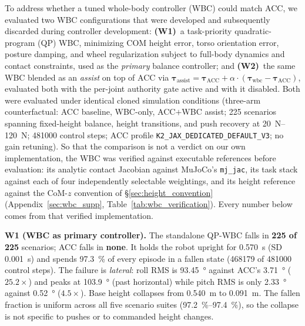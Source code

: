 \documentclass[conference]{IEEEtran}
\begin{document}
To address whether a tuned whole-body controller (WBC) could match ACC, we evaluated two WBC configurations that were developed and subsequently discarded during controller development:
\textbf{(W1)}~a task-priority quadratic-program (QP) WBC, minimizing COM height error, torso orientation error, posture damping, and wheel regularization subject to full-body dynamics and contact constraints, used as the \emph{primary} balance controller; and
\textbf{(W2)}~the same WBC blended as an \emph{assist} on top of ACC via $\boldsymbol{\tau}_{\text{assist}} = \boldsymbol{\tau}_{\text{ACC}} + \alpha\!\cdot\!(\boldsymbol{\tau}_{\text{wbc}} - \boldsymbol{\tau}_{\text{ACC}})$, evaluated both with the per-joint authority gate active and with it disabled.
Both were evaluated under identical cloned simulation conditions (three-arm counterfactual: ACC baseline, WBC-only, ACC$+$WBC assist; 225 scenarios spanning fixed-height balance, height transitions, and push recovery at \SIrange{20}{120}{N}; \num{481000} control steps; ACC profile \texttt{K2\_JAX\_DEDICATED\_DEFAULT\_V3}; no gain retuning).
So that the comparison is not a verdict on our own implementation, the WBC was verified against executable references before evaluation: its analytic contact Jacobian against MuJoCo's \texttt{mj\_jac}, its task stack against each of four independently selectable weightings, and its height reference against the CoM-$z$ convention of \S\ref{sec:height_convention} (Appendix~\ref{sec:wbc_supp}, Table~\ref{tab:wbc_verification}). Every number below comes from that verified implementation.

\medskip\noindent\textbf{W1 (WBC as primary controller).}
The standalone QP-WBC falls in \textbf{225 of 225} scenarios; ACC falls in \textbf{none}.
It holds the robot upright for \SI{0.570}{s} (SD \SI{0.001}{s}) and spends \SI{97.3}{\percent} of every episode in a fallen state (\num{468179} of \num{481000} control steps).
The failure is \emph{lateral}: roll RMS is \SI{93.45}{\degree} against ACC's \SI{3.71}{\degree} ($\num{25.2}\times$) and peaks at \SI{103.9}{\degree} (past horizontal) while pitch RMS is only \SI{2.33}{\degree} against \SI{0.52}{\degree} ($\num{4.5}\times$).
Base height collapses from \SI{0.540}{m} to \SI{0.091}{m}.
The fallen fraction is uniform across all five scenario suites (\SIrange{97.2}{97.4}{\percent}), so the collapse is not specific to pushes or to commanded height changes.
\end{document}

